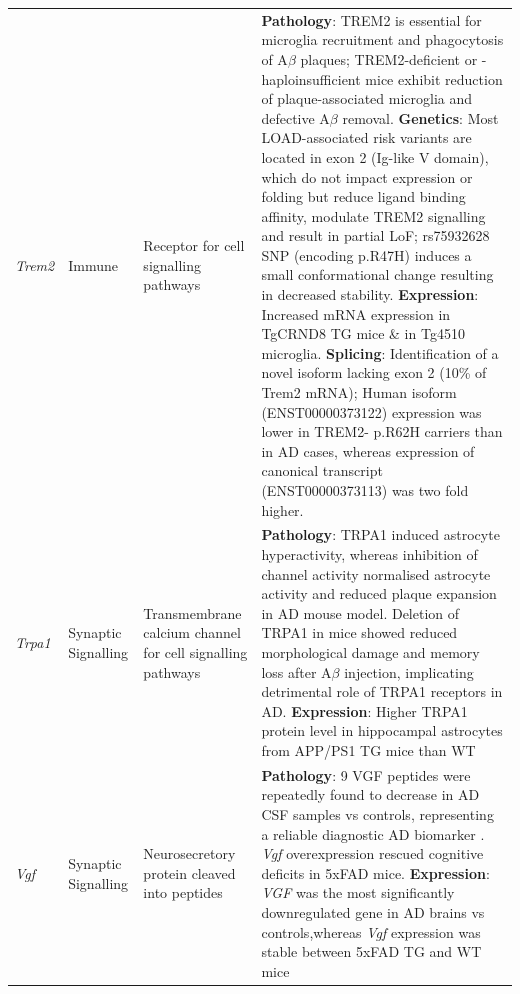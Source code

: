 \begin{landscape}
\begin{longtable}[c]{p{1cm}p{2cm}p{4cm}p{19cm}}
			\centering \textit{Trem2} &
			\centering Immune  &
			\centering Receptor for cell signalling pathways\newline &
			\tabitem \textbf{Pathology}: TREM2 is essential for microglia recruitment and phagocytosis of A$\beta$ plaques; TREM2-deficient or -haploinsufficient mice exhibit reduction of plaque-associated microglia and defective A$\beta$ removal\cite{Wang2015a}.\newline
			\tabitem \textbf{Genetics}: Most LOAD-associated risk variants are located in exon 2 (Ig-like V domain), which do not impact expression or folding but reduce ligand binding affinity\cite{Kober2016}, modulate TREM2 signalling and result in partial LoF\cite{Guerreiro2013a};  rs75932628 SNP (encoding p.R47H) induces a small conformational change resulting in decreased stability\cite{Kober2016}. \newline
			\tabitem \textbf{Expression}: Increased mRNA expression in TgCRND8 TG mice\cite{Guerreiro2013a} \& in Tg4510 microglia. \cite{Sobue2021} \newline
			\tabitem \textbf{Splicing}: Identification of a novel isoform lacking exon 2 (10\% of Trem2 mRNA)\cite{Kiianitsa2021}; Human isoform (ENST00000373122) expression was lower in TREM2- p.R62H carriers than in AD cases, whereas expression of canonical transcript (ENST00000373113) was two fold higher.\cite{Del-Aguila2019} \\
						
			\centering \textit{Trpa1} &
			\centering Synaptic Signalling  &
			\centering Transmembrane calcium channel for cell signalling pathways\newline &
			\tabitem \textbf{Pathology}: TRPA1 induced astrocyte hyperactivity, whereas inhibition of channel activity normalised astrocyte activity and reduced plaque expansion in AD mouse model\cite{Lee2016a}. Deletion of TRPA1 in mice showed reduced morphological damage and memory loss after A$\beta$ injection, implicating detrimental role of TRPA1 receptors in AD.\cite{Payrits2020} \newline
			\tabitem \textbf{Expression}: Higher TRPA1 protein level in hippocampal astrocytes from APP/PS1 TG mice than WT\cite{Lee2016a} \\
			\hdashline[0.5pt/5pt]
			
			\centering \textit{Vgf} &
			\centering Synaptic Signalling  &
			\centering Neurosecretory protein cleaved into peptides \newline &
			\tabitem \textbf{Pathology}: 9 VGF peptides were repeatedly found to decrease in AD CSF samples vs controls, representing a reliable diagnostic AD biomarker \cite{VanSteenoven2019}. \newline
			\tabitem \textit{Vgf} overexpression rescued cognitive deficits in 5xFAD mice\cite{Bai2020}. \newline
			\tabitem \textbf{Expression}: \textit{VGF} was the most significantly downregulated gene in AD brains vs controls\cite{Beckmann2020},whereas \textit{Vgf} expression was stable between 5xFAD TG and WT mice\cite{Bai2020} \\* \bottomrule
		\end{longtable}
	\end{landscape}

